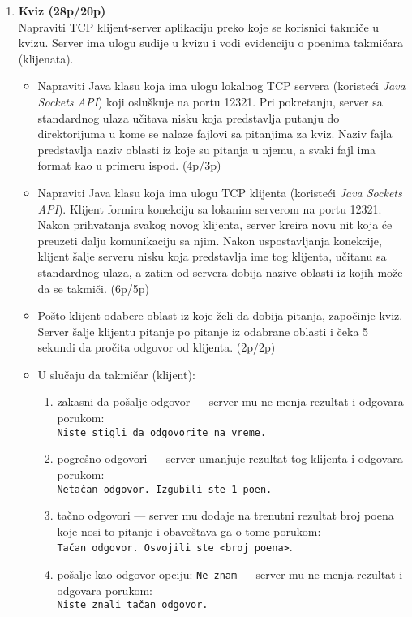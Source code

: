 \documentclass[]{article}
\begin{document}
\begin{enumerate}
\item \textbf{Kviz (28p/20p)}
\\Napraviti TCP klijent-server aplikaciju preko koje se korisnici takmiče u kvizu. Server ima ulogu sudije u kvizu i vodi evidenciju o poenima takmičara (klijenata).
\begin{itemize}
  \item Napraviti Java klasu koja ima ulogu lokalnog TCP servera (koristeći \textit{Java Sockets API}) koji osluškuje na portu 12321. Pri pokretanju, server sa standardnog ulaza učitava nisku koja predstavlja putanju do direktorijuma u kome se nalaze fajlovi sa pitanjima za kviz. Naziv fajla predstavlja naziv oblasti iz koje su pitanja u njemu, a svaki fajl ima format kao u primeru ispod. \hfill (4p/3p)
  \item Napraviti Java klasu koja ima ulogu TCP klijenta (koristeći \textit{Java Sockets API}). Klijent formira konekciju sa lokanim serverom na portu 12321. Nakon prihvatanja svakog novog klijenta, server kreira novu nit koja će preuzeti dalju komunikaciju sa njim. Nakon uspostavljanja konekcije, klijent šalje serveru nisku koja predstavlja ime tog klijenta, učitanu sa standardnog ulaza, a zatim od servera dobija nazive oblasti iz kojih može da se takmiči. \hfill (6p/5p)
  \item Pošto klijent odabere oblast iz koje želi da dobija pitanja, započinje kviz. Server šalje klijentu pitanje po pitanje iz odabrane oblasti i čeka 5 sekundi da pročita odgovor od klijenta. \hfill (2p/2p) 
  \item U slučaju da takmičar (klijent):
  \begin{enumerate}
      \item zakasni da pošalje odgovor --- server mu ne menja rezultat i odgovara porukom:\\ \texttt{Niste stigli da odgovorite na vreme.}
      \item pogrešno odgovori --- server umanjuje rezultat tog klijenta i odgovara porukom:\\ \texttt{Netačan odgovor. Izgubili ste 1 poen.}
      \item tačno odgovori --- server mu dodaje na trenutni rezultat broj poena koje nosi to pitanje i obaveštava ga o tome porukom:\\ \texttt{Tačan odgovor. Osvojili ste <broj poena>}.
      \item pošalje kao odgovor opciju: \texttt{Ne znam} --- server mu ne menja rezultat i odgovara porukom:\\ \texttt{Niste znali tačan odgovor.}

\end{enumerate}
\end{itemize}
\end{enumerate}
\end{document}

